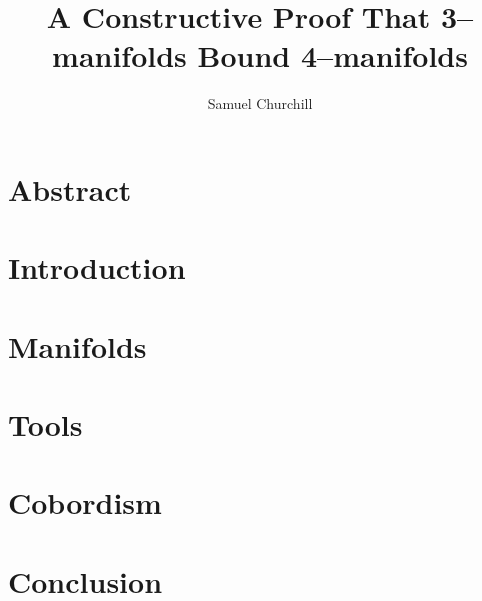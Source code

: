 \documentclass[12pt]{report}
\author{Samuel Churchill}
\title{A Constructive Proof That 3--manifolds Bound 4--manifolds}
\begin{document}
\maketitle

\chapter*{Abstract}


\tableofcontents
\listoffigures


\chapter{Introduction}


\chapter{Manifolds}
\label{cha:manifolds}


\chapter{Tools}
\label{cha:tools}


\chapter{Cobordism}
\label{cha:cobordisms}


%

\chapter{Conclusion}



%

{}

\end{document}
